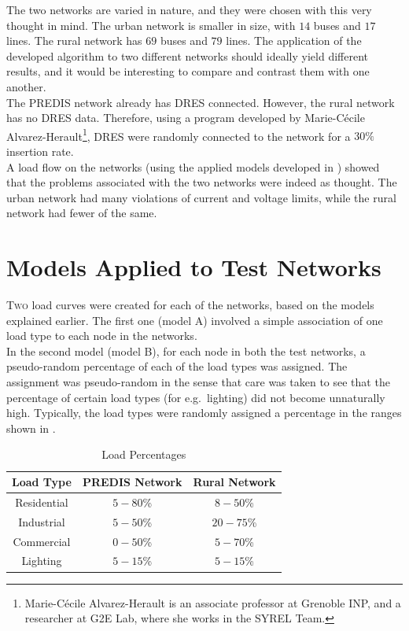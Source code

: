 The two networks are varied in nature, and they were chosen with this very thought in mind. The urban network is smaller in size, with $14$ buses and $17$ lines. The rural network has $69$ buses and $79$ lines. The application of the developed algorithm to two different networks should ideally yield different results, and it would be interesting to compare and contrast them with one another.\\

The PREDIS network already has DRES connected. However, the rural network has no DRES data. Therefore, using a program developed by Marie-C\'{e}cile Alvarez-Herault\footnote{Marie-C\'{e}cile Alvarez-Herault is an associate professor at Grenoble INP, and a researcher at G2E Lab, where she works in the SYREL Team.}, DRES were randomly connected to the network for a $30\%$ insertion rate.\\

A load flow on the networks (using the applied models developed in ) showed that the problems associated with the two networks were indeed as thought. The urban network had many violations of current and voltage limits, while the rural network had fewer of the same.

\section {Models Applied to Test Networks}

\lettrine[nindent=0pt]{T}{wo} load curves were created for each of the networks, based on the models explained earlier. The first one (model A) involved a simple association of one load type to each node in the networks.\\

In the second model (model B), for each node in both the test networks, a pseudo-random percentage of each of the load types was assigned. The assignment was pseudo-random in the sense that care was taken to see that the percentage of certain load types (for e.g.\ lighting) did not become unnaturally high. Typically, the load types were randomly assigned a percentage in the ranges shown in .\\

\begin{table}[H]
\centering
\begin{tabular}{ccc}
\rowcolor{gray!25}
\textbf{Load Type} & \textbf{PREDIS Network} & \textbf{Rural Network}\\
\hline
Residential & $5-80$\% & $8-50$\% \\
\rowcolor{gray!15}
Industrial & $5-50$\% & $20-75$\% \\
Commercial & $0-50$\% & $5-70$\% \\
\rowcolor{gray!15}
Lighting & $5-15$\% & $5-15$\% \\
\hline
\end{tabular}
\caption{Load Percentages}
\end{table}

